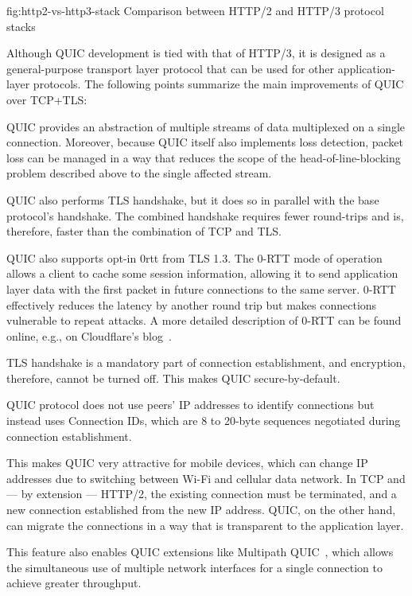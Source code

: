 \begin{myFigure} {fig:http2-vs-http3-stack} {Comparison between HTTP/2 and HTTP/3 protocol stacks}

  

\end{myFigure}

Although QUIC development is tied with that of HTTP/3, it is designed as a general-purpose transport
layer protocol that can be used for other application-layer protocols. The following points
summarize the main improvements of QUIC over TCP+TLS:

\begin{itemize}

     QUIC provides an abstraction of multiple streams of data multiplexed
on a single connection. Moreover, because QUIC itself also implements loss detection, packet loss
can be managed in a way that reduces the scope of the \gls{head-of-line-blocking} problem described
above to the single affected stream.

     QUIC also performs TLS handshake, but it does so in
parallel with the base protocol's handshake. The combined handshake requires fewer round-trips and
is, therefore, faster than the combination of TCP and TLS\@.

    QUIC also supports opt-in \gls{0rtt} from TLS 1.3. The 0-RTT mode of operation allows a client
to cache some session information, allowing it to send application layer data with the first packet
in future connections to the same server. 0-RTT effectively reduces the latency by another round
trip but makes connections vulnerable to repeat attacks. A more detailed description of 0-RTT can be
found online, e.g., on Cloudflare's blog~\cite{cloudflare-0rtt}.

     TLS handshake is a mandatory part of connection establishment, and
encryption, therefore, cannot be turned off. This makes QUIC secure-by-default.

     QUIC protocol does not use peers'
IP addresses to identify connections but instead uses Connection IDs, which are 8 to 20-byte
sequences negotiated during connection establishment.

    This makes QUIC very attractive for mobile devices, which can change IP addresses due to
switching between Wi-Fi and cellular data network. In TCP and --- by extension --- HTTP/2, the existing
connection must be terminated, and a new connection established from the new IP address. QUIC, on
the other hand, can migrate the connections in a way that is transparent to the application layer.

    This feature also enables QUIC extensions like Multipath
QUIC~\cite{draft-deconinck-quic-multipath-04}, which allows the simultaneous use of multiple network
interfaces for a single connection to achieve greater throughput.

\end{itemize}

